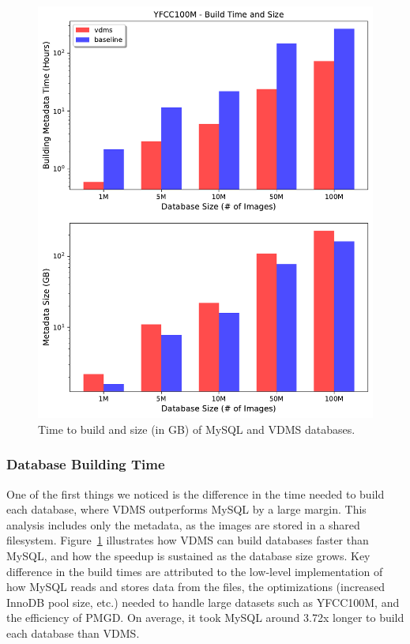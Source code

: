 \begin{figure}[ht]
\centering
\includegraphics[width=\columnwidth]{figures/db_time_size}
\caption{Time to build and size (in GB) of MySQL and VDMS databases.}
\label{fig:db_time_size}
\end{figure}

\subsubsection{Database Building Time}

One of the first things we noticed is the difference in the time needed to
build each database, where VDMS outperforms MySQL by a large margin.
This analysis includes only the metadata, as the images are stored in a shared filesystem.
Figure~\ref{fig:db_time_size} illustrates how VDMS can build databases
faster than MySQL, and how the speedup is sustained as the database size grows.
Key difference in the build times are attributed to the low-level
implementation of how MySQL reads and stores data from the files, the
optimizations (increased InnoDB pool size, etc.) needed
to handle large datasets such as YFCC100M, and the efficiency of PMGD.
On average, it took MySQL around 3.72x longer to build each database than VDMS.

